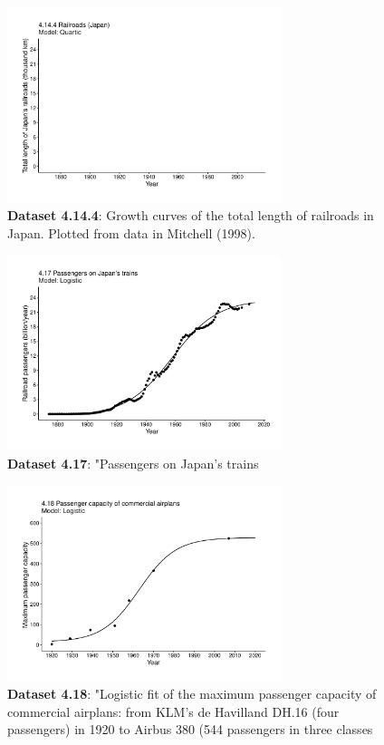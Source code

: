 \documentclass[aps,rmp,preprint,superscriptaddress,10pt,onecolumn]{article}
\begin{document}
\begin{figure}[h]
\includegraphics[width=8cm]{output/figs-ggplot/4.14.4.pdf}
\caption{\textbf{Dataset 4.14.4}: Growth curves of the total length of railroads in Japan. Plotted from data in Mitchell (1998).}
\end{figure}
	
\begin{figure}[h]
\includegraphics[width=8cm]{output/figs-ggplot/4.17.pdf}
\caption{\textbf{Dataset 4.17}: "Passengers on Japan's trains}
\end{figure}
	
\begin{figure}[h]
\includegraphics[width=8cm]{output/figs-ggplot/4.18.pdf}
\caption{\textbf{Dataset 4.18}: "Logistic fit of the maximum passenger capacity of commercial airplans: from KLM's de Havilland DH.16 (four passengers) in 1920 to Airbus 380 (544 passengers in three classes}
\end{figure}
	
\end{document}
